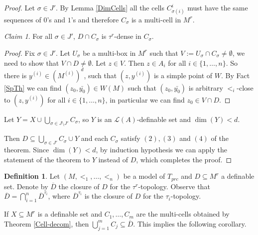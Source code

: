 \documentclass[12pt]{article}
\theoremstyle{definition}
\newtheorem{defi}[thm]{Definition}
\theoremstyle{mystyle}
\theoremstyle{remark}
\newtheorem*{claim}{Claim}
\newenvironment{claimproof}
    {\begin{proof}}{\renewcommand\qedsymbol{\Squarepipe} \end{proof}}
\newcommand{\LC}{\mathcal{L}}
\newcommand{\clos}[2]{#1^{(#2)}}
\begin{document}
\begin{proof}
Let $\sigma\in J'$. By Lemma \ref{DimCells} all the cells $C^i_{\sigma(i)}$
must have the same sequences of $0$'s and $1$'s and therefore
$C_{\sigma}$ is a multi-cell in $M^r$.


\begin{claim}
 For all $\sigma \in J'$, $D\cap C_{\sigma}$ is $\tau^r$-dense in $C_\sigma$.
\end{claim}
\begin{claimproof}
Fix $\sigma \in J'$. Let $U_{\sigma}$ be a multi-box in $M^r$ such
that $V:= U_{\sigma} \cap C_{\sigma} \not = \emptyset$, we need to
show that $V \cap D  \not = \emptyset.$ Let $z \in V$. Then $z \in
A_i$ for all $i \in \{1, \ldots, n\}$. So there is $y^{(i)} \in
(\clos{M}{i})^{d}$, such that $(z, y^{(i)})$ is a simple point of
$W$. By Fact \ref{SpTh} we can find $(z_0, \bar{y_0}) \in W(M)$
such that $(z_0, \bar{y_0})$ is arbitrary $<_i$-close to $(z,
y^{(i)})$ for all $i\in \{1, \ldots, n\}$, in particular we can
find $z_0 \in V\cap D$.
\end{claimproof}



Let $Y= X \cup \displaystyle{\bigcup_{\sigma \in J \setminus
J'}C_{\sigma}}$, so $Y$ is an $\LC(A)$-definable set and
$\dim(Y)<d$.

Then $D \subseteq \displaystyle{\bigcup_{\sigma \in J'}C_{\sigma}
\cup Y}$ and each $C_{\sigma}$ satisfy $(2), (3)$ and $(4)$ of the
theorem. Since $\dim(Y)< d$, by induction hypothesis we can apply
the statement of the theorem to $Y$ instead of $D$, which
completes the proof.
\end{proof}


\begin{defi}
Let $(M, <_1, \ldots, <_n)$ be a model of $T_{prc}$ and $D\subseteq M^r$ a definable set.
Denote by $\overline{D}$ the closure of $D$ for the $\tau^r$-topology.
Observe that $\overline{D} = \displaystyle{\bigcap_{i=1}^n\overline{D}^{\tau_i}}$, where $\overline{D}^{\tau_i}$ is the closure of $D$ for the $\tau_i$-topology.
\end{defi}


If $X \subseteq M^r$ is a definable set and $C_1, \ldots, C_m$ are
the multi-cells obtained by Theorem \ref{Cell-decom}, then
$\displaystyle{\bigcup_{j=1}^m C_j} \subseteq \overline{D}$. This
implies the following corollary.
\end{document}

